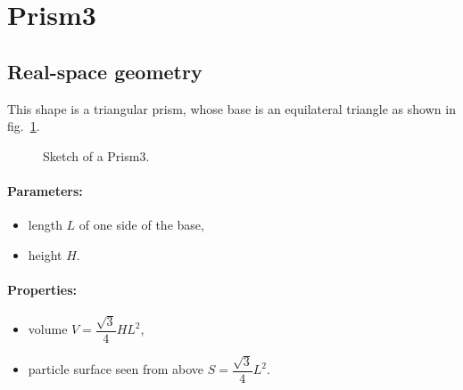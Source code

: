 \newpage{\cleardoublepage}
\section{Prism3} 
 
\subsection{Real-space geometry}
This shape is a triangular prism, whose base is an equilateral
triangle as shown in fig.~\ref{fig:prism3}.

\begin{figure}[ht]
\hfill
{}
\hfill
{}
\hfill
\caption{Sketch of a Prism3.}
\label{fig:prism3}
\end{figure}

\FloatBarrier

\paragraph{Parameters:}
\begin{itemize}
\item length $L$ of one side of the base, 
\item height $H$.
\end{itemize}

\paragraph{Properties:}
\begin{itemize}
\item volume $V= \dfrac{\sqrt{3}}{4} H L^2$,
\item particle surface seen from above $S =\dfrac{\sqrt{3}}{4}L^2$.
\end{itemize}

